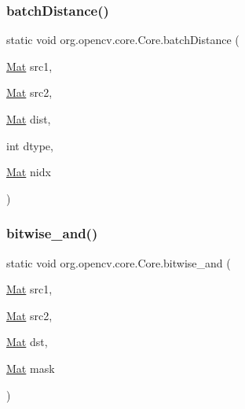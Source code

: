 \mbox{\label{classorg_1_1opencv_1_1core_1_1_core_a316866023305882fb794af7a3db7299c}} 
\subsubsection{\texorpdfstring{batch\+Distance()}{batchDistance()}\hspace{0.1cm}{\footnotesize\ttfamily [3/3]}}
{\footnotesize\ttfamily static void org.\+opencv.\+core.\+Core.\+batch\+Distance (\begin{DoxyParamCaption}\item[{\mbox{\hyperlink{classorg_1_1opencv_1_1core_1_1_mat}{Mat}}}]{src1,  }\item[{\mbox{\hyperlink{classorg_1_1opencv_1_1core_1_1_mat}{Mat}}}]{src2,  }\item[{\mbox{\hyperlink{classorg_1_1opencv_1_1core_1_1_mat}{Mat}}}]{dist,  }\item[{int}]{dtype,  }\item[{\mbox{\hyperlink{classorg_1_1opencv_1_1core_1_1_mat}{Mat}}}]{nidx }\end{DoxyParamCaption})\hspace{0.3cm}{\ttfamily [static]}}

\mbox{\label{classorg_1_1opencv_1_1core_1_1_core_a848cb46acc8307c57896d9835e90f86c}} 
\subsubsection{\texorpdfstring{bitwise\+\_\+and()}{bitwise\_and()}\hspace{0.1cm}{\footnotesize\ttfamily [1/2]}}
{\footnotesize\ttfamily static void org.\+opencv.\+core.\+Core.\+bitwise\+\_\+and (\begin{DoxyParamCaption}\item[{\mbox{\hyperlink{classorg_1_1opencv_1_1core_1_1_mat}{Mat}}}]{src1,  }\item[{\mbox{\hyperlink{classorg_1_1opencv_1_1core_1_1_mat}{Mat}}}]{src2,  }\item[{\mbox{\hyperlink{classorg_1_1opencv_1_1core_1_1_mat}{Mat}}}]{dst,  }\item[{\mbox{\hyperlink{classorg_1_1opencv_1_1core_1_1_mat}{Mat}}}]{mask }\end{DoxyParamCaption})\hspace{0.3cm}{\ttfamily [static]}}

